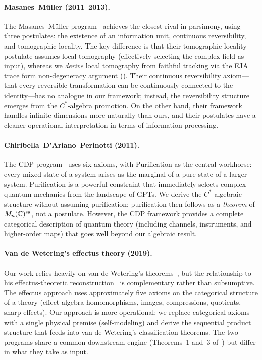 \paragraph{Masanes--M\"uller (2011--2013).}
The Masanes--M\"uller program~\cite{MasanesMueller2011,MasanesMueller2013}
achieves the closest rival in parsimony, using three postulates:
the existence of an information unit, continuous reversibility, and
tomographic locality.  The key difference is that their tomographic
locality postulate assumes local tomography (effectively selecting the
complex field as input), whereas we \emph{derive} local tomography
from faithful tracking via the EJA trace form non-degeneracy argument
().  Their continuous reversibility axiom---that
every reversible transformation can be continuously connected to the
identity---has no analogue in our framework; instead, the
reversibility structure emerges from the $C^{*}$-algebra promotion.
On the other hand, their framework handles infinite dimensions more
naturally than ours, and their postulates have a cleaner operational
interpretation in terms of information processing.

\paragraph{Chiribella--D'Ariano--Perinotti (2011).}
The CDP program~\cite{CDP2011} uses six axioms, with Purification as
the central workhorse: every mixed state of a system arises as the
marginal of a pure state of a larger system.  Purification is a
powerful constraint that immediately selects complex quantum mechanics
from the landscape of GPTs.  We derive the $C^{*}$-algebraic structure
without assuming purification; purification then follows as a
\emph{theorem} of $M_{n}(\mathbb{C})^{\mathrm{sa}}$, not a postulate.  However, the CDP
framework provides a complete categorical description of quantum
theory (including channels, instruments, and higher-order maps) that
goes well beyond our algebraic result.

\paragraph{Van de Wetering's effectus theory (2019).}
Our work relies heavily on van de Wetering's
theorems~\cite{vandeWetering2019b}, but the relationship to his
effectus-theoretic reconstruction~\cite{vandeWetering2019} is
complementary rather than subsumptive.  The effectus approach uses
approximately five axioms on the categorical structure of a theory
(effect algebra homomorphisms, images, compressions, quotients, sharp
effects).  Our approach is more operational: we replace categorical
axioms with a single physical premise (self-modeling) and derive the
sequential product structure that feeds into van de Wetering's
classification theorems.  The two programs share a common downstream
engine (Theorems~1 and~3 of~\cite{vandeWetering2019b}) but differ in
what they take as input.

